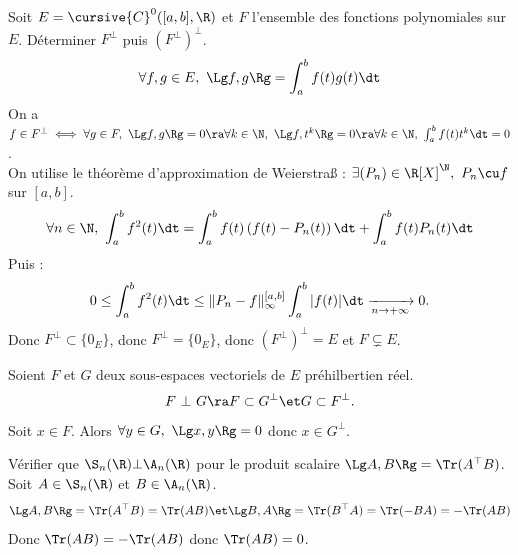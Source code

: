 \documentclass[11pt]{article}
\begin{document}
\vspace*{-0.8cm}

\begin{ex}{}{}
    Soit $E=\cursive{C}^0([a,b],\R)$ et $F$ l'ensemble des fonctions polynomiales sur $E$. Déterminer $F^\bot$ puis $(F^\bot)^\bot$.
    \begin{equation*}
        \forall f,g \in E, ~ \Lg f,g \Rg = \int_a^b f(t)g(t)\dt
    \end{equation*}
    \tcblower
    On a $f\in F^\bot \iff \forall g \in F, ~ \Lg f,g \Rg = 0 \ra \forall k \in \N, ~ \Lg f,t^k\Rg = 0 \ra \forall k \in \N, ~ \int_a^b f(t)t^k\dt=0$.\\
    On utilise le théorème d'approximation de Weierstraß : $\exists (P_n)\in\R[X]^\N, ~ P_n \cu f$ sur $[a,b]$.
    \begin{equation*}
        \forall n \in \N, ~ \int_a^b f^2(t)\dt = \int_a^b f(t)\left( f(t) - P_n(t) \right)\dt + \int_a^b f(t)P_n(t)\dt
    \end{equation*}
    Puis :
    \begin{equation*}
        0 \leq \int_a^b f^2(t)\dt \leq \|P_n - f\|_{\infty}^{[a,b]} \int_a^b|f(t)|\dt \xrightarrow[n\to+\infty]{}0.
    \end{equation*}
    Donc $F^{\bot} \subset \{0_E\}$, donc $F^\bot = \{0_E\}$, donc $(F^\bot)^\bot = E$ et $F\subsetneq E$.
\end{ex}

\begin{prop}{}{}
    Soient $F$ et $G$ deux sous-espaces vectoriels de $E$ préhilbertien réel.
    \begin{equation*}
        F ~ \bot ~ G \ra F \subset G^\bot \et G \subset F^\bot.
    \end{equation*}
    \tcblower
    Soit $x\in F$. Alors $\forall y \in G, ~ \Lg x, y \Rg = 0$ donc $x\in G^\bot$.
\end{prop}

\vspace*{-0.7cm}

\begin{exercice}{}{}
    Vérifier que $\S_n(\R) \bot \A_n(\R)$ pour le produit scalaire $\Lg A,B \Rg = \Tr(A^\top B)$.
    \tcblower
    Soit $A\in\S_n(\R)$ et $B\in\A_n(\R)$.
    \begin{equation*}
        \Lg A, B \Rg = \Tr(A^\top B) = \Tr(AB) \et \Lg B, A \Rg = \Tr(B^\top A) = \Tr(-BA)= -\Tr(AB)
    \end{equation*}
    Donc $\Tr(AB)=-\Tr(AB)$ donc $\Tr(AB)=0$. 
\end{exercice}
\end{document}
